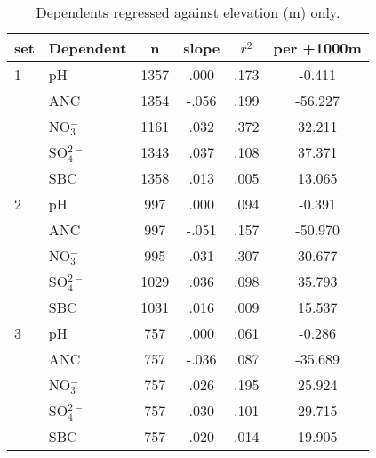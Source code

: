 \begin{table}[htbp]
\centering
\caption[Elevation trends]{Dependents regressed against elevation (m) only.}
\begin{tabular}{llcccc}
\toprule
set & Dependent & n & slope&$r^2$&per +1000m \\ 
\midrule
1   & pH               & 1357 & .000 & .173 & -0.411  \\ 
     & ANC            & 1354 & -.056 & .199 & -56.227  \\ 
     &  NO$_3^-$ & 1161 & .032 & .372 & 32.211  \\ 
     &  SO$_4^{2-}$& 1343 & .037 & .108 & 37.371  \\ 
     & SBC             & 1358 & .013 & .005 & 13.065  \\ 
\midrule
2   & pH               & 997 & .000 & .094 & -0.391  \\ 
     & ANC            & 997 & -.051 & .157 & -50.970  \\ 
     &  NO$_3^-$  & 995 & .031 & .307 & 30.677  \\ 
     &  SO$_4^{2-}$ & 1029 & .036 & .098 & 35.793  \\ 
     & SBC             & 1031 & .016 & .009 & 15.537  \\ 
 \midrule
3   & pH              & 757 & .000 & .061 & -0.286  \\ 
     & ANC           & 757 & -.036 & .087 & -35.689  \\ 
     &  NO$_3^-$ & 757 & .026 & .195 & 25.924  \\ 
     &  SO$_4^{2-}$ & 757 & .030 & .101 & 29.715  \\ 
     & SBC            & 757 & .020 & .014 & 19.905  \\ 
 \bottomrule
\end{tabular}
\label{Water quality per elevation}
\end{table}
